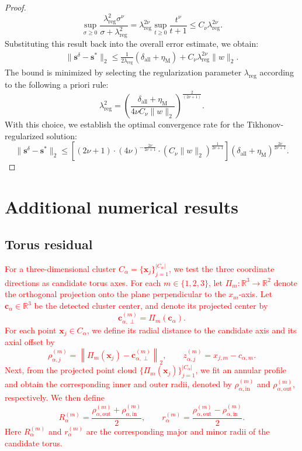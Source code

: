 \documentclass{article}
\newcommand{\red}[1]{\textcolor{red}{#1}}
\theoremstyle{plain}
\theoremstyle{definition}
\begin{document}
{\begin{proof}
\begin{equation*}
    \sup_{\sigma\ge0} \frac{\lambda_{\text{reg}}^2 \sigma^{\nu}}{\sigma+\lambda_{\text{reg}}^2} = \lambda_{\text{reg}}^{2\nu}  \sup_{t \ge 0} \frac{t^{\nu}}{t+1} \le C_{\nu} \lambda_{\text{reg}}^{2\nu}.
\end{equation*}
Substituting this result back into the overall error estimate,  we obtain: 
\begin{align*}
    \|\boldsymbol{s}^{\delta}-\boldsymbol{s}^{*}\|_2\le \frac{1}{2 \lambda_{\text{reg}}}(\delta_{\text{all}}+\eta_\text{M})+ C_{\nu} \lambda_{\text{reg}}^{2\nu}\|w\|_2.
\end{align*}
The bound is minimized by selecting the regularization parameter $\lambda_{\text{reg}}$ according to the following a priori rule: 
$$\lambda_{\text{reg}}^2=\left(\frac{\delta_{\text{all}}+\eta_\text{M}}{4\nu C_{\nu}\|w\|_2}\right)^{\frac{2}{(2\nu+1)}}.$$
With this choice,  we establish the optimal convergence rate for the Tikhonov-regularized solution: 
$$\|\boldsymbol{s}^{\delta}-\boldsymbol{s}^{*}\|_2\leq \left[ (2\nu+1) \cdot (4\nu)^{-\frac{2\nu}{2\nu+1}} \cdot (C_{\nu}\|w\|_2)^{\frac{1}{2\nu+1}} \right] (\delta_{\text{all}}+\eta_\text{M})^{\frac{2\nu}{2\nu+1}}.$$
\end{proof}



\section{Additional numerical results}
\subsection{Torus residual}\label{app:torus_residual}
\red{For a three-dimensional cluster \(C_\alpha=\{\boldsymbol{x}_j\}_{j=1}^{|C_\alpha|}\), we test the three coordinate directions as candidate torus axes. For each \(m\in\{1,2,3\}\), let
  \(\Pi_m:\mathbb{R}^3\to\mathbb{R}^2\) denote the orthogonal projection onto the plane perpendicular to the \(x_m\)-axis. Let \(\boldsymbol{c}_\alpha\in\mathbb{R}^3\) be the detected
  cluster center, and denote its projected center by
  \[
\boldsymbol{c}_{\alpha,\perp}^{(m)}=\Pi_m(\boldsymbol{c}_\alpha).
  \]
  For each point \(\boldsymbol{x}_j\in C_\alpha\), we define its radial distance to the candidate axis and its axial offset by
  \[
  \rho_{\alpha,j}^{(m)}
  =
  \left\|
  \Pi_m(\boldsymbol{x}_j)-\boldsymbol{c}_{\alpha,\perp}^{(m)}
  \right\|_2,
  \qquad
  z_{\alpha,j}^{(m)}=x_{j,m}-c_{\alpha,m}.
  \]
  Next, from the projected point cloud \(\{\Pi_m(\boldsymbol{x}_j)\}_{j=1}^{|C_\alpha|}\), we fit an annular profile and obtain the corresponding inner and outer radii, denoted by
  \(\rho_{\alpha,\mathrm{in}}^{(m)}\) and \(\rho_{\alpha,\mathrm{out}}^{(m)}\), respectively. We then define
  \[
  R_\alpha^{(m)}
  =\frac{\rho_{\alpha,\mathrm{out}}^{(m)}+\rho_{\alpha,\mathrm{in}}^{(m)}}{2},
  \qquad
  r_\alpha^{(m)}
  =
  \frac{\rho_{\alpha,\mathrm{out}}^{(m)}-\rho_{\alpha,\mathrm{in}}^{(m)}}{2}.
  \]
  Here \(R_\alpha^{(m)}\) and \(r_\alpha^{(m)}\) are the corresponding major and minor radii of the candidate torus.}

}
\end{document}
